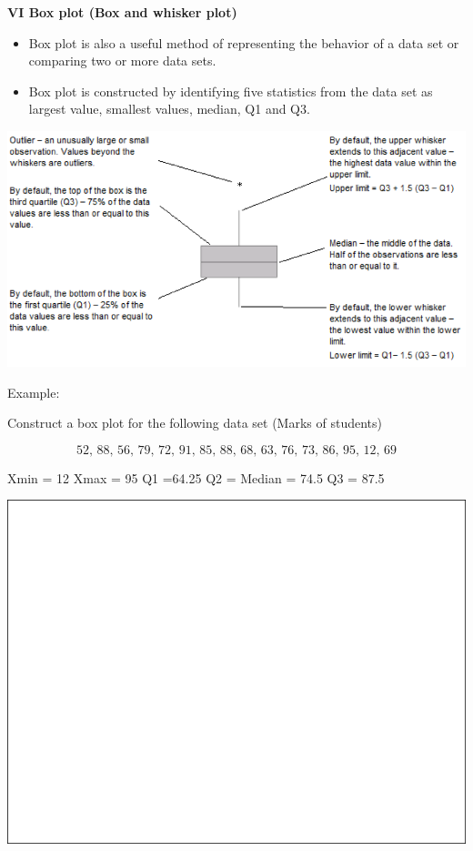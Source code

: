 \documentclass[]{book}
\providecommand{\tightlist}{%
  \setlength{\itemsep}{0pt}\setlength{\parskip}{0pt}}
\begin{document}
\textbf{VI Box plot (Box and whisker plot)}

\begin{itemize}
\tightlist
\item
  Box plot is also a useful method of representing the behavior of a data set or comparing two or more data sets.
\item
  Box plot is constructed by identifying five statistics from the data set as largest value, smallest values, median, Q1 and Q3.
\end{itemize}

\begin{center}\includegraphics[width=1\linewidth]{figure/boxplot} \end{center}

Example:

Construct a box plot for the following data set (Marks of students)

\[\text{52, 88, 56, 79, 72, 91,  85, 88, 68, 63, 76, 73, 86, 95, 12, 69}\]

Xmin = 12 Xmax = 95 Q1 =64.25 Q2 = Median = 74.5 Q3 = 87.5

\begin{center}\includegraphics[width=1\linewidth]{figure/box61-1} \end{center}
\end{document}
